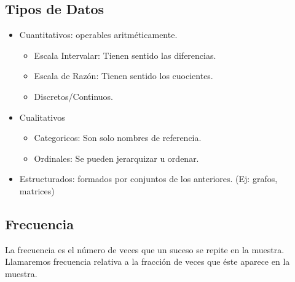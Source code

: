	\subsection{Tipos de Datos}
		\begin{itemize}
			\item Cuantitativos: operables aritm\'eticamente.
				\begin{itemize}
					\item Escala Intervalar: Tienen sentido las diferencias.
					\item Escala de Raz\'on: Tienen sentido los cuocientes.
					\item Discretos/Continuos.
				\end{itemize}
			\item Cualitativos
				\begin{itemize}
					\item Categoricos: Son solo nombres de referencia.
					\item Ordinales: Se pueden jerarquizar u ordenar.
				\end{itemize}
			\item Estructurados: formados por conjuntos de los anteriores. (Ej: grafos, matrices)
		\end{itemize}
	\subsection{Frecuencia}
		La frecuencia es el n\'umero de veces que un suceso se repite en la muestra. Llamaremos frecuencia relativa a la fracci\'on de veces que \'este aparece en la muestra.

